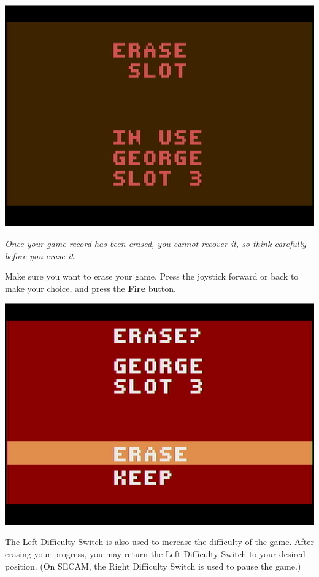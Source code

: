 \documentclass[9pt,twocolumn,openany,article]{memoir}
\begin{document}
\begin{center}
  \includegraphics[width=.75\columnwidth]{../Manual/EraseSlotNTSC.png}
\end{center}

\ifdefined\DEMO

\emph{Once your game record has been  erased, you cannot recover it, so
  think carefully before you erase it.}

\else

Make sure  you want to  erase your game.  Press the joystick  forward or
back to make your choice, and press the \textbf{Fire} button.

\begin{center}
  \includegraphics[width=.75\columnwidth]{../Manual/ConfirmEraseNTSC.png}
\end{center}

\fi

The Left  Difficulty Switch is also  used to increase the  difficulty of
the  game.  After  erasing  your  progress,  you  may  return  the  Left
Difficulty  Switch  to  your  desired position.  (On  SECAM,  the  Right
Difficulty Switch is used to pause the game.)
\end{document}
